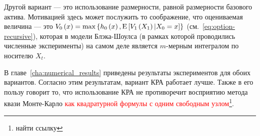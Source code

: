 Другой вариант --- это использование размерности, равной размерности базового актива. Мотивацией здесь может послужить то соображение, что оцениваемая величина --- это $V_0\left(x\right) = \max\left\lbrace h_0\left(x\right),\mathrm{E}\left[V_1\left(X_1\right)|X_0=x\right]\right\rbrace$ (см.~\eqref{eq:option-recursive}), которая в модели Блэка-Шоулса (в рамках которой проводились численные эксперименты) на самом деле является $m$-мерным интегралом по носителю $X_t$.

В главе~\ref{cha:numerical_results} приведены результаты экспериментов для обоих вариантов. Согласно этим результатам, вариант КРА работает лучше. Также в его пользу говорит то, что использование КРА не противоречит восприятию метода квази Монте-Карло \textcolor{red}{как квадратурной формулы с одним свободным узлом}\footnote{найти ссылку}.





